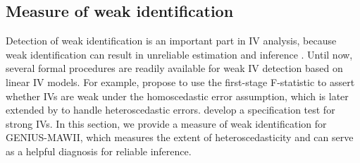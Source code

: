 \documentclass[12pt]{article}
\begin{document}
\vspace{-3mm}

\subsection{Measure of weak identification}
\label{subsec: measure of weak identification}
Detection of weak identification is an important part in IV analysis, because weak identification can result in unreliable estimation and inference \citep{Stock:2002aa}. Until now, several formal procedures are readily available for weak IV detection based on linear IV models. {For example, \cite{Stock2001:ivtest} propose to use the first-stage F-statistic to assert whether IVs are weak under the homoscedastic error assumption, which is later extended by \cite{olea2013robust} to handle heteroscedastic errors.}  \cite{Hahn:2002aa} develop a specification test for strong IVs.   In this section, we provide a measure of weak identification for GENIUS-MAWII, which measures the extent of heteroscedasticity and can serve as a helpful diagnosis for reliable inference.
\end{document}
